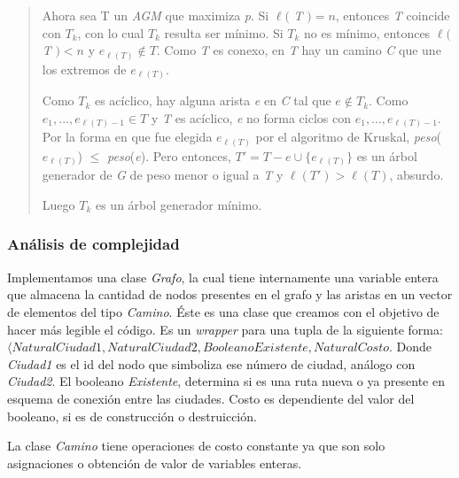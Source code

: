 \begin{itemize}
\begin{quotation}
\quad Ahora sea T un \textit{AGM} que maximiza \textit{p}. Si $\ell($ \textit{T} $) = n $, entonces \textit{T} coincide con $ T_k $, con lo cual $ T_k $ resulta ser m\'inimo. Si $ T_k $ no es m\'inimo, entonces $\ell($ \textit{T} $) < n $ y $ e_{\ell(T)} \notin T $. Como \textit{T} es conexo, en \textit{T} hay un camino \textit{C} que une los extremos de $ e_{\ell(T)} $.

\quad Como $ T_k $ es ac\'iclico, hay alguna arista \textit{e} en \textit{C} tal que $ e\notin T_k $. Como $ e_1, ..., e_{\ell(T) - 1} \in T $ y \textit{T} es ac\'iclico, \textit{e} no forma ciclos con $ e_1, ..., e_{\ell(T) - 1} $.
Por la forma en que fue elegida $ e_{\ell(T)} $ por el algoritmo de Kruskal, \textit{peso}($e_{\ell(T)}$) $ \leq $ \textit{peso}(\textit{e}).
Pero entonces, $ T' = T - e \cup \lbrace e_{\ell(T)} \rbrace $ es un \'arbol generador de \textit{G} de peso menor o igual a \textit{T} y $ \ell(T') > \ell(T)$, absurdo.

\quad Luego $ T_k $ es un \'arbol generador m\'inimo.

\end{quotation} 

\end{itemize}

\subsubsection{An\'alisis de complejidad}

\quad Implementamos una clase \textit{Grafo}, la cual tiene internamente una variable entera que almacena la cantidad de nodos presentes en el grafo y las aristas en un vector de elementos del tipo \textit{Camino}. \'Este es una clase que creamos con el objetivo de hacer m\'as legible el c\'odigo. Es un \textit{wrapper} para una tupla de la siguiente forma: $ \langle Natural Ciudad1, Natural Ciudad2, Booleano Existente, Natural Costo $. Donde \textit{Ciudad1} es el id del nodo que simboliza ese n\'umero de ciudad, an\'alogo con \textit{Ciudad2}. El booleano \textit{Existente}, determina si es una ruta nueva o ya presente en esquema de conexi\'on entre las ciudades. Costo es dependiente del valor del booleano, si es de construcci\'on o destruicci\'on. 

\quad

\quad La clase \textit{Camino} tiene operaciones de costo constante ya que son solo asignaciones o obtenci\'on de valor de variables enteras.

\quad

